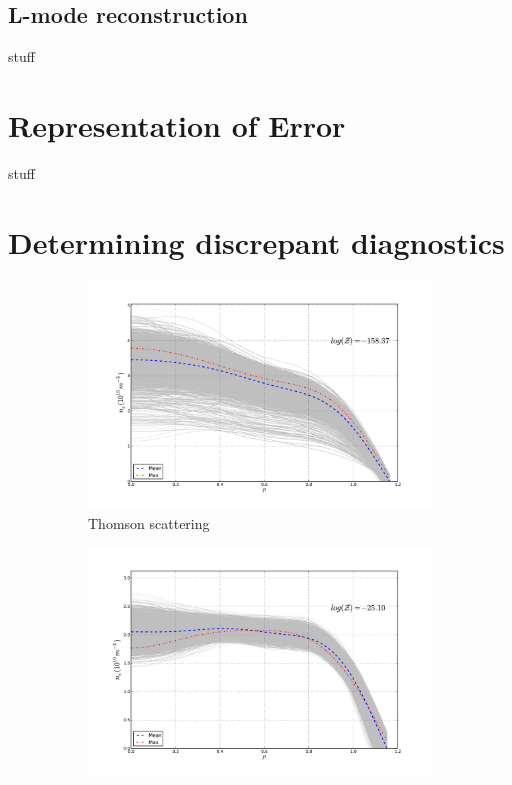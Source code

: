 \documentclass[12pt]{article}
\numberwithin{equation}{section}
\begin{document}
\subsection{L-mode reconstruction}
stuff
\section{Representation of Error}
stuff
\section{Determining discrepant diagnostics}
\begin{figure}[ht]
	\centering
	\begin{subfigure}[b]{0.5\textwidth}
		\centering
		\includegraphics[width=\textwidth,keepaspectratio=true]{figures/bfit146102_00505_thom5}
		\vspace{-30pt}
		\caption{Thomson scattering}
		\label{fig:ts505}
	\end{subfigure}
	\hspace{-20pt}
	\begin{subfigure}[b]{0.5\textwidth}
		\centering
		\includegraphics[width=\textwidth,keepaspectratio=true]{figures/bfit146102_00505_inter5}

\end{subfigure}
\end{figure}
\end{document}
